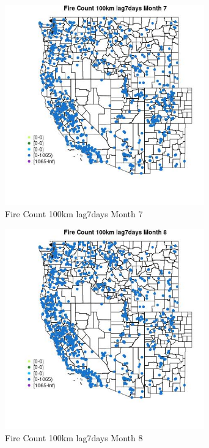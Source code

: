 \begin{figure} 
\centering  
\includegraphics[width=0.77\textwidth]{Code_Outputs/Report_ML_input_PM25_Step4_part_f_de_duplicated_aves_prioritize_24hr_obswNAs_MapObsMo7Fire_Count_100km_lag7days.jpg} 
\caption{\label{fig:Report_ML_input_PM25_Step4_part_f_de_duplicated_aves_prioritize_24hr_obswNAsMapObsMo7Fire_Count_100km_lag7days}Fire Count 100km lag7days Month 7} 
\end{figure} 
 

\clearpage 

\begin{figure} 
\centering  
\includegraphics[width=0.77\textwidth]{Code_Outputs/Report_ML_input_PM25_Step4_part_f_de_duplicated_aves_prioritize_24hr_obswNAs_MapObsMo8Fire_Count_100km_lag7days.jpg} 
\caption{\label{fig:Report_ML_input_PM25_Step4_part_f_de_duplicated_aves_prioritize_24hr_obswNAsMapObsMo8Fire_Count_100km_lag7days}Fire Count 100km lag7days Month 8} 
\end{figure} 
 

